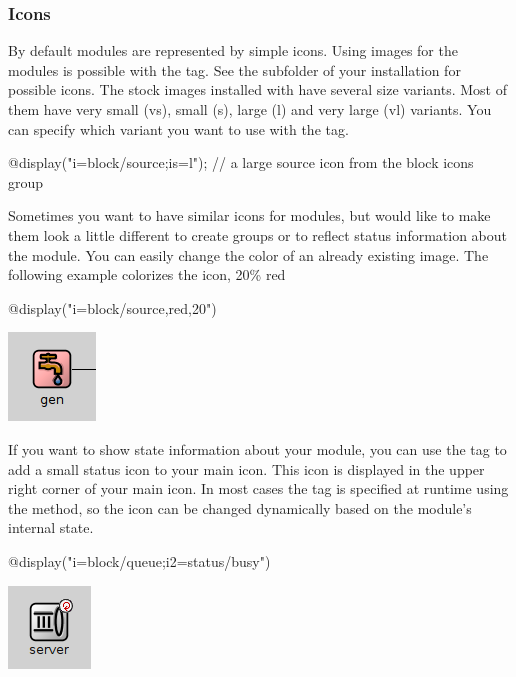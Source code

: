 \subsubsection{Icons}
By default modules are represented by simple icons.
Using images for the modules is possible with the  tag.
See the  subfolder of your {\opp} installation for possible
icons. The stock images installed with {\opp} have several size variants.
Most of them have very small (vs), small (s), large (l) and
very large (vl) variants. You can specify which variant you want to use with
the  tag.

\begin{ned}
@display("i=block/source;is=l"); // a large source icon from the block icons group
\end{ned}

Sometimes you want to have similar icons for modules, but would like to
make them look a little different to create groups or to reflect status
information about the module. You can easily change the color of an already existing image.
The following example colorizes the  icon, 20\% red

\begin{ned}
@display("i=block/source,red,20")
\end{ned}

\begin{center}
\includegraphics{figures/graphics-itag}
\end{center}

If you want to show state information about your module, you can use the  tag to
add a small status icon to your main icon. This icon is displayed in the upper right corner
of your main icon. In most cases the  tag is specified at runtime using
the  method, so the icon can be changed dynamically based on the
module's internal state.

\begin{ned}
@display("i=block/queue;i2=status/busy")
\end{ned}

\begin{center}
\includegraphics{figures/graphics-i2tag}
\end{center}


